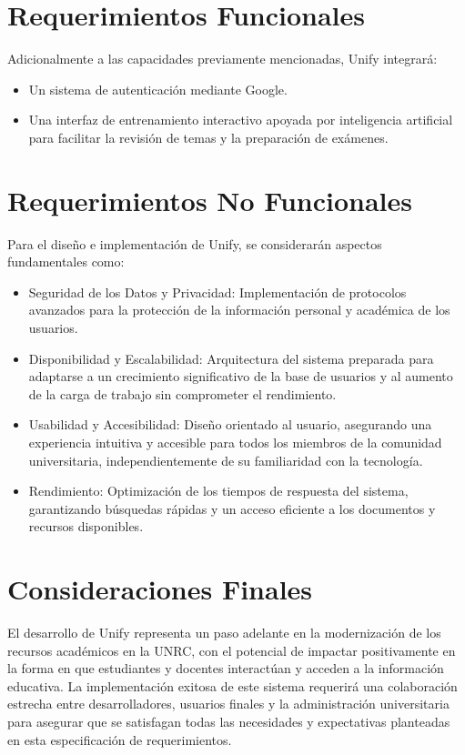 \documentclass[10pt]{article}
\begin{document}
\section{Requerimientos Funcionales}
Adicionalmente a las capacidades previamente mencionadas, Unify integrará:
\begin{itemize}
  \item Un sistema de autenticación mediante Google.
  \item Una interfaz de entrenamiento interactivo apoyada por inteligencia artificial para facilitar la revisión de temas y la preparación de exámenes.
\end{itemize}

\section{Requerimientos No Funcionales}
Para el diseño e implementación de Unify, se considerarán aspectos fundamentales como:
\begin{itemize}
  \item Seguridad de los Datos y Privacidad: Implementación de protocolos avanzados para la protección de la información personal y académica de los usuarios.
  \item Disponibilidad y Escalabilidad: Arquitectura del sistema preparada para adaptarse a un crecimiento significativo de la base de usuarios y al aumento de la carga de trabajo sin comprometer el rendimiento.
  \item Usabilidad y Accesibilidad: Diseño orientado al usuario, asegurando una experiencia intuitiva y accesible para todos los miembros de la comunidad universitaria, independientemente de su familiaridad con la tecnología.
  \item Rendimiento: Optimización de los tiempos de respuesta del sistema, garantizando búsquedas rápidas y un acceso eficiente a los documentos y recursos disponibles.
\end{itemize}

\section{Consideraciones Finales}
El desarrollo de Unify representa un paso adelante en la modernización de los recursos académicos en la UNRC, con el potencial de impactar positivamente en la forma en que estudiantes y docentes interactúan y acceden a la información educativa. La implementación exitosa de este sistema requerirá una colaboración estrecha entre desarrolladores, usuarios finales y la administración universitaria para asegurar que se satisfagan todas las necesidades y expectativas planteadas en esta especificación de requerimientos.
\end{document}
